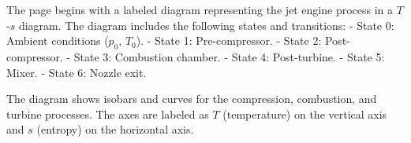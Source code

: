 The page begins with a labeled diagram representing the jet engine process in a \( T \)-\( s \) diagram. The diagram includes the following states and transitions:  
- State 0: Ambient conditions (\( p_0 \), \( T_0 \)).  
- State 1: Pre-compressor.  
- State 2: Post-compressor.  
- State 3: Combustion chamber.  
- State 4: Post-turbine.  
- State 5: Mixer.  
- State 6: Nozzle exit.  

The diagram shows isobars and curves for the compression, combustion, and turbine processes. The axes are labeled as \( T \) (temperature) on the vertical axis and \( s \) (entropy) on the horizontal axis.